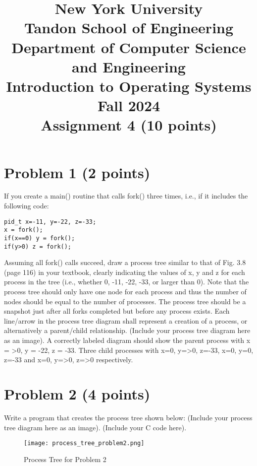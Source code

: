 \documentclass{article}
\title{New York University \\ Tandon School of Engineering \\ Department of Computer Science and Engineering \\ Introduction to Operating Systems \\ Fall 2024 \\ Assignment 4 (10 points)}
\author{}
\date{}
\begin{document}
\maketitle

\section*{Problem 1 (2 points)}

If you create a main() routine that calls fork() three times, i.e., if it includes the following code:

\begin{verbatim}
pid_t x=-11, y=-22, z=-33;
x = fork();
if(x==0) y = fork();
if(y>0) z = fork();
\end{verbatim}

Assuming all fork() calls succeed, draw a process tree similar to that of Fig. 3.8 (page 116) in your textbook, clearly indicating the values of x, y and z for each process in the tree (i.e., whether 0, -11, -22, -33, or larger than 0).  Note that the process tree should only have one node for each process and thus the number of nodes should be equal to the number of processes. The process tree should be a snapshot just after all forks completed but before any process exists. Each line/arrow in the process tree diagram shall represent a creation of a process, or alternatively a parent/child relationship.  (Include your process tree diagram here as an image).  A correctly labeled diagram should show the parent process with x = >0, y = -22, z = -33.  Three child processes with x=0, y=>0, z=-33, x=0, y=0, z=-33 and x=0, y=>0, z=>0 respectively.


\section*{Problem 2 (4 points)}

Write a program that creates the process tree shown below: (Include your process tree diagram here as an image).  (Include your C code here).

\begin{figure}[h]
\centering
\texttt{[image: process\_tree\_problem2.png]}
\caption{Process Tree for Problem 2}
\label{fig:process_tree_problem2}
\end{figure}
\end{document}
